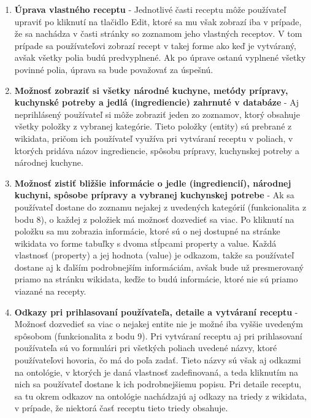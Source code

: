 \begin{enumerate}
\item \textbf{Úprava vlastného receptu} - Jednotlivé časti receptu môže používateľ upraviť po kliknutí na tlačidlo Edit, ktoré sa mu však zobrazí iba v prípade, že sa nachádza v časti stránky so zoznamom jeho vlastných receptov. V tom prípade sa používateľovi zobrazí recept v takej forme ako keď je vytváraný, avšak všetky polia budú predvyplnené. Ak po úprave ostanú vyplnené všetky povinné polia, úprava sa bude považovať za úspešnú.

\item \textbf{Možnosť zobraziť si všetky národné kuchyne, metódy prípravy, kuchynské potreby a jedlá (ingrediencie) zahrnuté v databáze} - Aj neprihlásený používateľ si môže zobraziť jeden zo zoznamov, ktorý obsahuje všetky položky z vybranej kategórie. Tieto položky (entity) sú prebrané z wikidata, pričom ich používateľ využíva pri vytváraní receptu v poliach, v ktorých pridáva názov ingrediencie, spôsobu prípravy, kuchynskej potreby a národnej kuchyne.

\item \textbf{Možnosť zistiť bližšie informácie o jedle (ingrediencií), národnej kuchyni, spôsobe prípravy a vybranej kuchynskej potrebe} - 
Ak sa používateľ dostane do zoznamu nejakej z uvedených kategórií (funkcionalita z bodu 8), o každej z položiek má možnosť dozvedieť sa viac. Po kliknutí na položku sa mu zobrazia informácie, ktoré sú o nej dostupné na stránke wikidata vo forme tabuľky s dvoma stĺpcami property a value. Každá vlastnosť (property) a jej hodnota (value) je odkazom, takže sa používateľ dostane aj k ďalším podrobnejším informáciám, avšak bude už presmerovaný priamo na stránku wikidata, keďže to budú informácie, ktoré nie sú priamo viazané na recepty.  

\item \textbf{Odkazy pri prihlasovaní používateľa, detaile a vytváraní receptu} - Možnosť dozvedieť sa viac o nejakej entite nie je možné iba vyššie uvedeným spôsobom (funkcionalita z bodu 9). Pri vytváraní receptu aj pri prihlasovaní používateľa sú vo formulári pri všetkých poliach uvedené názvy, ktoré používateľovi hovoria, čo má do poľa zadať. Tieto názvy sú však aj odkazmi na ontológie, v ktorých je daná vlastnosť zadefinovaná, a teda kliknutím na nich sa používateľ dostane k ich podrobnejšiemu popisu. Pri detaile receptu, sa tu okrem odkazov na ontológie nachádzajú aj odkazy na triedy z wikidata, v prípade, že niektorá časť receptu tieto triedy obsahuje.   
\end{enumerate}

